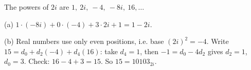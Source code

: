 The powers of $2i$ are $1,\ 2i,\ -4,\ -8i,\ 16,\dots$

(a) $1\cdot(-8i)+0\cdot(-4)+3\cdot2i+1=\boxed{1-2i}$.

(b) Real numbers use only even positions, i.e. base $(2i)^2=-4$. Write $15=d_0+d_2(-4)+d_4(16)$: take $d_4=1$, then $-1=d_0-4d_2$ gives $d_2=1$, $d_0=3$. Check: $16-4+3=15$. So $15=\boxed{10103_{2i}}$.
